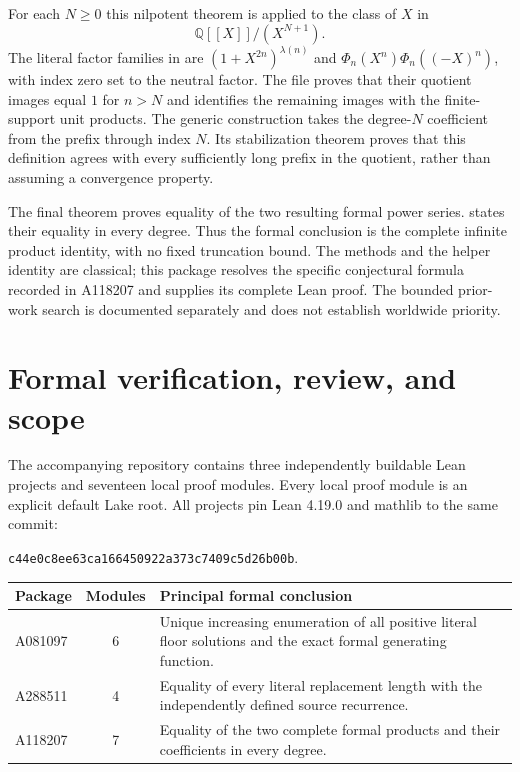 \documentclass[11pt]{article}
\begin{document}
For each $N\ge0$ this nilpotent theorem is applied to the class of $X$ in
\[
 \mathbb{Q}[[X]]/(X^{N+1}).
\]
The literal factor families in  are
$(1+X^{2n})^{\lambda(n)}$ and
$\Phi_n(X^n)\Phi_n((-X)^n)$, with index zero set to the neutral factor.
The file proves that their quotient images equal $1$ for $n>N$ and
identifies the remaining images with the finite-support unit products.
The generic construction  takes the degree-$N$
coefficient from the prefix through index $N$. Its stabilization theorem
proves that this definition agrees with every sufficiently long prefix
in the quotient, rather than assuming a convergence property.

The final theorem  proves equality of
the two resulting formal power series.
 states their equality in
every degree. Thus the formal conclusion is the complete infinite
product identity, with no fixed truncation bound. The methods and
the helper identity are classical; this package resolves the specific
conjectural formula recorded in A118207 and supplies its complete Lean
proof. The bounded prior-work search is documented separately and does
not establish worldwide priority.

\section{Formal verification, review, and scope}

The accompanying repository contains three independently buildable Lean
projects and seventeen local proof modules. Every local proof module is
an explicit default Lake root. All projects pin Lean 4.19.0 and mathlib
to the same commit:
\begin{center}
\texttt{c44e0c8ee63ca166450922a373c7409c5d26b00b}.
\end{center}

\begin{center}
\begin{tabular}{@{}lcp{3.8in}@{}}
\toprule
Package & Modules & Principal formal conclusion\\
\midrule
A081097 & 6 & Unique increasing enumeration of all positive literal floor solutions and the exact formal generating function.\\
A288511 & 4 & Equality of every literal replacement length with the independently defined source recurrence.\\
A118207 & 7 & Equality of the two complete formal products and their coefficients in every degree.\\
\bottomrule
\end{tabular}
\end{center}
\end{document}
